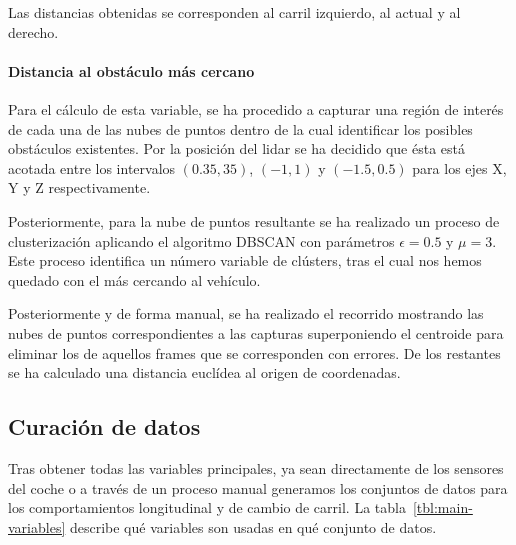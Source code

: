 Las distancias obtenidas se corresponden al carril izquierdo, al actual y al derecho.

\paragraph{Distancia al obstáculo más cercano}

Para el cálculo de esta variable, se ha procedido a capturar una región de interés de cada una de las nubes de puntos dentro de la cual identificar los posibles obstáculos existentes. Por la posición del lidar se ha decidido que ésta está acotada entre los intervalos $(0.35, 35)$, $(-1, 1)$ y $(-1.5, 0.5)$ para los ejes X, Y y Z respectivamente.

Posteriormente, para la nube de puntos resultante se ha realizado un proceso de clusterización aplicando el algoritmo DBSCAN con parámetros $\epsilon = 0.5$ y $\mu = 3$. Este proceso identifica un número variable de clústers, tras el cual nos hemos quedado con el más cercando al vehículo.

Posteriormente y de forma manual, se ha realizado el recorrido mostrando las nubes de puntos correspondientes a las capturas superponiendo el centroide para eliminar los de aquellos frames que se corresponden con errores. De los restantes se ha calculado una distancia euclídea al origen de coordenadas.

\subsection{Curación de datos}

Tras obtener todas las variables principales, ya sean directamente de los sensores del coche o a través de un proceso manual generamos los conjuntos de datos para los comportamientos longitudinal y de cambio de carril. La tabla~\ref{tbl:main-variables} describe qué variables son usadas en qué conjunto de datos.

